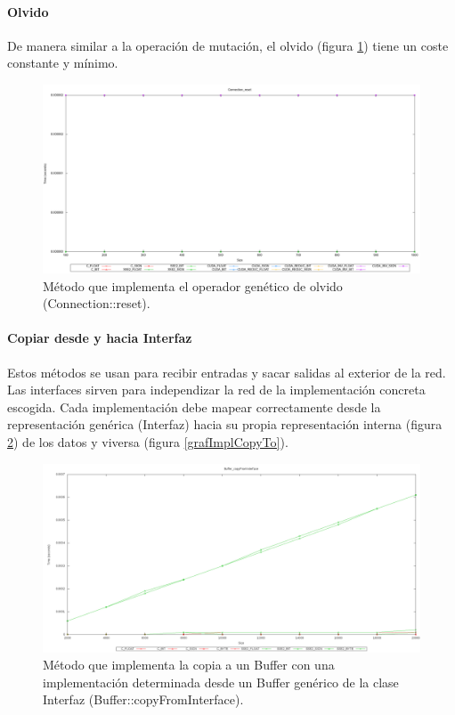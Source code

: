 \documentclass[11pt]{article}
\begin{document}
\begin{titlepage}
\paragraph{Olvido}
\label{sec-6-1-1-5}


De manera similar a la operación de mutación, el olvido (figura \ref{grafImplReset}) tiene un coste constante y mínimo.

\begin{figure}[htb]
\centering
\includegraphics[width=\textwidth]{./img/Connection_reset.png}
\caption{\label{grafImplReset}Método que implementa el operador genético de olvido (Connection::reset).}
\end{figure}
\newpage
\paragraph{Copiar desde y hacia Interfaz}
\label{sec-6-1-1-6}


Estos métodos se usan para recibir entradas y sacar salidas al exterior de la red. Las interfaces sirven para independizar la red de la implementación concreta escogida. Cada implementación debe mapear correctamente desde la representación genérica (Interfaz) hacia su propia representación interna (figura \ref{grafImplCopyFrom}) de los datos y viversa (figura \ref{grafImplCopyTo}).

\begin{figure}[htb]
\centering
\includegraphics[width=\textwidth]{./img/Buffer_copyFromInterface.png}
\caption{\label{grafImplCopyFrom}Método que implementa la copia a un Buffer con una implementación determinada desde un Buffer genérico de la clase Interfaz (Buffer::copyFromInterface).}
\end{figure}


\end{titlepage}
\end{document}
